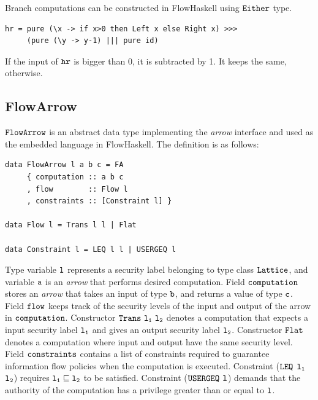 \documentclass[a4paper]{report}
\newcommand{\co}[1]{$\cod{#1}$}
\begin{document}
Branch computations can be constructed in FlowHaskell using \co{Either} type.
\begin{Verbatim}[fontsize=\footnotesize]
hr = pure (\x -> if x>0 then Left x else Right x) >>>
     (pure (\y -> y-1) ||| pure id)
\end{Verbatim}
If the input of \co{hr} is bigger than 0, it is subtracted by 1. It keeps the same, otherwise.

\subsection{FlowArrow}
\label{chap3:flowarrow}
\co{FlowArrow} is an abstract data type implementing the {\em arrow} interface and used
as the embedded language in FlowHaskell. The definition is as follows:
\begin{Verbatim}[fontsize=\footnotesize]
data FlowArrow l a b c = FA
     { computation :: a b c
     , flow        :: Flow l
     , constraints :: [Constraint l] }

data Flow l = Trans l l | Flat

data Constraint l = LEQ l l | USERGEQ l
\end{Verbatim}
Type variable \co{l} represents a security label belonging to type class \co{Lattice},
and variable \co{a} is an {\em arrow} that performs desired computation.
Field \co{computation} stores an {\em arrow} that takes an input of type \co{b}, and returns a
value of type \co{c}. 
Field \co{flow} keeps track of the security levels of the input and output of the arrow 
in \co{computation}. 
Constructor $\mathtt{Trans}~\mathtt{l_1}~\mathtt{l_2}$ denotes a computation that expects a input 
security label \co{l_1} and gives an output security label \co{l_2}. Constructor
\co{Flat} denotes a computation where input and output have the same security level.
Field \co{constraints} contains a list of constraints required to guarantee information
flow policies when the computation is executed.
Constraint (\co{LEQ} \co{l_1} \co{l_2}) requires $\mathtt{l_1}\sqsubseteq\mathtt{l_2}$ to be satisfied.
Constraint (\co{USERGEQ} \co{l}) demands that the authority of the computation has
a privilege greater than or equal to \co{l}.
\end{document}
